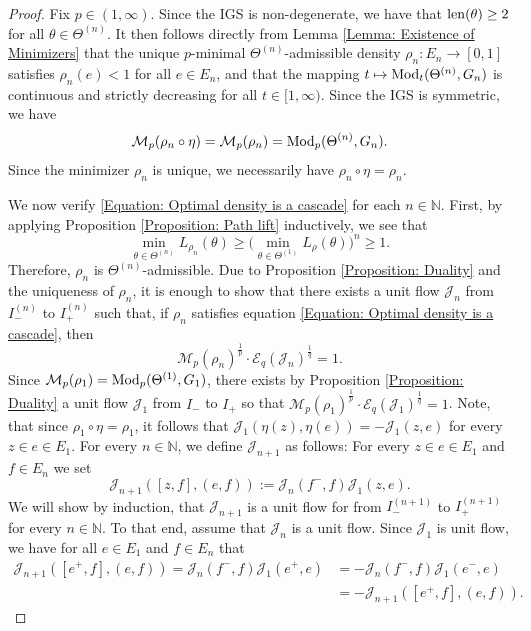 \documentclass{amsart}
\newcommand{\len}{{\rm len}}
\newcommand{\Mod}{{\rm Mod}}
\numberwithin{equation}{section}
\theoremstyle{definition}
\theoremstyle{remark}
\newcommand{\N}{\mathbb{N}}
\newcommand{\cE}{\mathcal{E}}
\newcommand{\cJ}{\mathcal{J}}
\newcommand{\cM}{\mathcal{M}}
\begin{document}
\begin{proof}
    
    Fix \(p\in(1,\infty)\). Since the IGS is non-degenerate, we have that \(\len(\theta)\geq 2\) for all \(\theta\in\Theta^{(n)}\). It then follows directly from Lemma \ref{Lemma: Existence of Minimizers} that the unique \(p\)-minimal \(\Theta^{(n)}\)-admissible density \(\rho_n\colon E_n\to[0,1]\) satisfies \(\rho_n(e)<1\) for all \(e\in E_n\), and that the mapping \(t\mapsto\Mod_t(\Theta^{(n)},G_n)\) is continuous and strictly decreasing for all \(t\in[1,\infty)\). Since the IGS is symmetric, we have
        \[
            \cM_p(\rho_n\circ \eta)=\cM_p(\rho_n)=\Mod_p(\Theta^{(n)},G_n).
        \]
    Since the minimizer $\rho_n$ is unique, we necessarily have \(\rho_n\circ \eta=\rho_n\). 
    
    We now verify \eqref{Equation: Optimal density is a cascade} for each \(n\in\N\). First, by applying Proposition \ref{Proposition: Path lift} inductively, we see that
        \[
            \min_{\theta\in\Theta^{(n)}}L_{\rho_n}(\theta)\geq\big(\min_{\theta\in\Theta^{(1)}}L_{\rho}(\theta)\big)^n\geq1.
        \]
    Therefore, \(\rho_n\) is \(\Theta^{(n)}\)-admissible. Due to Proposition \ref{Proposition: Duality} and the uniqueness of \(\rho_n\), it is enough to show that there exists a unit flow \(\cJ_n\) from \(I^{(n)}_-\) to \(I^{(n)}_+\) such that, if \(\rho_n\) satisfies equation \eqref{Equation: Optimal density is a cascade}, then 
        \[
            \cM_p(\rho_n)^\frac{1}{p}\cdot \cE_q(\cJ_n)^\frac{1}{q}=1.
        \]
    Since \(\cM_p(\rho_1)=\Mod_p(\Theta^{(1)},G_1)\), there exists by Proposition \ref{Proposition: Duality} a unit flow \(\cJ_1\) from \(I_-\) to \(I_+\) so that \(\cM_p(\rho_1)^\frac{1}{p}\cdot\cE_q(\cJ_1)^\frac{1}{q}=1\). Note, that since \(\rho_1\circ \eta = \rho_1\), it follows that \(\cJ_1(\eta(z),\eta(e))=-\cJ_1(z,e)\) for every \(z\in e\in E_1\). For every \(n\in\N\), we define \(\cJ_{n+1}\) as follows: For every \(z\in e\in E_1\) and \(f\in E_n\) we set
        \[
            \cJ_{n+1}([z,f],(e,f)):=\cJ_{n}(f^-,f)\cJ_1(z,e).
        \]
    We will show by induction, that \(\cJ_{n+1}\) is a unit flow for from \(I_-^{(n+1)}\) to \(I_+^{(n+1)}\) for every \(n\in \N\). To that end, assume that \(\cJ_n\) is a unit flow. Since \(\cJ_1\) is unit flow, we have for all \(e\in E_1\) and \(f\in E_n\) that
        \[
        \begin{split}
            \cJ_{n+1}([e^+,f],(e,f))=\cJ_{n}(f^-,f)\cJ_1(e^+,e)
            &=-\cJ_{n}(f^-,f)\cJ_1(e^-,e)\\&=-\cJ_{n+1}([e^+,f],(e,f)).

\end{split}\]
\end{proof}
\end{document}
